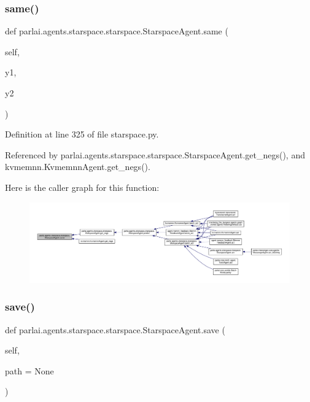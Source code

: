 \subsubsection{\texorpdfstring{same()}{same()}}
{\footnotesize\ttfamily def parlai.\+agents.\+starspace.\+starspace.\+Starspace\+Agent.\+same (\begin{DoxyParamCaption}\item[{}]{self,  }\item[{}]{y1,  }\item[{}]{y2 }\end{DoxyParamCaption})}



Definition at line 325 of file starspace.\+py.



Referenced by parlai.\+agents.\+starspace.\+starspace.\+Starspace\+Agent.\+get\+\_\+negs(), and kvmemnn.\+Kvmemnn\+Agent.\+get\+\_\+negs().

Here is the caller graph for this function\+:
\nopagebreak
\begin{figure}[H]
\begin{center}
\leavevmode
\includegraphics[width=350pt]{classparlai_1_1agents_1_1starspace_1_1starspace_1_1StarspaceAgent_a763de34b8d6464cbaa1ba17bf83f7df0_icgraph}
\end{center}
\end{figure}
\mbox{\label{classparlai_1_1agents_1_1starspace_1_1starspace_1_1StarspaceAgent_a55b3dab4e31cee40441105efb66004ac}} 
\subsubsection{\texorpdfstring{save()}{save()}}
{\footnotesize\ttfamily def parlai.\+agents.\+starspace.\+starspace.\+Starspace\+Agent.\+save (\begin{DoxyParamCaption}\item[{}]{self,  }\item[{}]{path = {\ttfamily None} }\end{DoxyParamCaption})}

